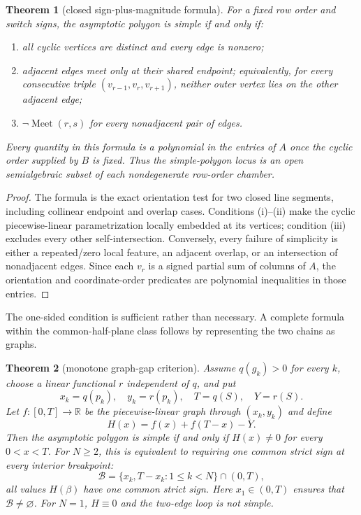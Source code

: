 \documentclass[11pt,twoside,leqno]{article}
\theoremstyle{plain}
\newtheorem{theorem}{Theorem}[section]
\theoremstyle{definition}
\theoremstyle{remark}
\newcommand{\R}{\mathbb{R}}
\begin{document}
\begin{theorem}[closed sign-plus-magnitude formula]\label{thm:closed-form}
For a fixed row order and switch signs, the asymptotic polygon is simple if and only if:
\begin{enumerate}[label=(\roman*),leftmargin=*]
\item all cyclic vertices are distinct and every edge is nonzero;
\item adjacent edges meet only at their shared endpoint; equivalently, for every consecutive triple $(v_{r-1},v_r,v_{r+1})$, neither outer vertex lies on the other adjacent edge;
\item $\neg\operatorname{Meet}(r,s)$ for every nonadjacent pair of edges.
\end{enumerate}
Every quantity in this formula is a polynomial in the entries of $A$ once the cyclic order supplied by $B$ is fixed.  Thus the simple-polygon locus is an open semialgebraic subset of each nondegenerate row-order chamber.
\end{theorem}

\begin{proof}
The formula is the exact orientation test for two closed line segments, including collinear endpoint and overlap cases.  Conditions (i)--(ii) make the cyclic piecewise-linear parametrization locally embedded at its vertices; condition (iii) excludes every other self-intersection.  Conversely, every failure of simplicity is either a repeated/zero local feature, an adjacent overlap, or an intersection of nonadjacent edges.  Since each $v_r$ is a signed partial sum of columns of $A$, the orientation and coordinate-order predicates are polynomial inequalities in those entries.
\end{proof}

The one-sided condition is sufficient rather than necessary.  A complete formula within the common-half-plane class follows by representing the two chains as graphs.

\begin{theorem}[monotone graph-gap criterion]\label{thm:graph-gap}
Assume $q(g_k)>0$ for every $k$, choose a linear functional $r$ independent of $q$, and put
\[
 x_k=q(p_k),\quad y_k=r(p_k),\quad T=q(S),\quad Y=r(S).
\]
Let $f:[0,T]\to\R$ be the piecewise-linear graph through $(x_k,y_k)$ and define
\[
 H(x)=f(x)+f(T-x)-Y.
\]
Then the asymptotic polygon is simple if and only if $H(x)\neq0$ for every $0<x<T$.  For $N\ge2$, this is equivalent to requiring one common strict sign at every interior breakpoint:
\[
 \mathcal B=\{x_k,T-x_k:1\le k<N\}\cap(0,T),
\]
all values $H(\beta)$ have one common strict sign. Here $x_1\in(0,T)$ ensures that $\mathcal B\ne\varnothing$. For $N=1$, $H\equiv0$ and the two-edge loop is not simple.
\end{theorem}
\end{document}
